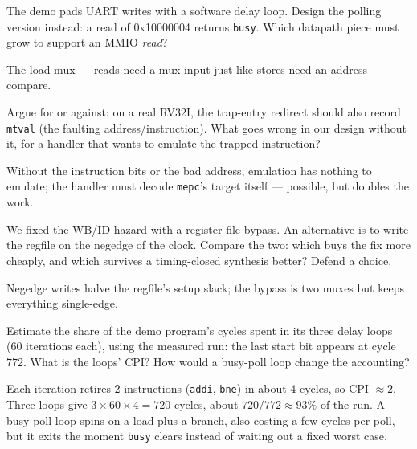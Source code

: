 \begin{exercise}[medium]

The demo pads UART writes with a software delay loop. Design the
polling version instead: a read of 0x10000004 returns
\texttt{busy}. Which datapath piece must grow to support an MMIO
\emph{read}?
\end{exercise}
\begin{solution}[hint]
The load mux --- reads need a mux input just like stores need
an address compare.
\end{solution}

\begin{exercise}[hard]

Argue for or against: on a real RV32I, the trap-entry redirect
should also record \texttt{mtval} (the faulting address/instruction).
What goes wrong in our design without it, for a handler that wants
to emulate the trapped instruction?
\end{exercise}
\begin{solution}[hint]
Without the instruction bits or the bad address, emulation has
nothing to emulate; the handler must decode \texttt{mepc}'s target
itself --- possible, but doubles the work.
\end{solution}

\begin{exercise}[hard]

We fixed the WB/ID hazard with a register-file bypass. An
alternative is to write the regfile on the negedge of the clock.
Compare the two: which buys the fix more cheaply, and which survives
a timing-closed synthesis better? Defend a choice.
\end{exercise}
\begin{solution}[hint]
Negedge writes halve the regfile's setup slack; the bypass is
two muxes but keeps everything single-edge.
\end{solution}

\begin{exercise}[hard]

Estimate the share of the demo program's cycles spent in its three
delay loops (60 iterations each), using the measured run: the last
start bit appears at cycle 772. What is the loops' CPI? How would a
busy-poll loop change the accounting?
\end{exercise}
\begin{solution}[hint]
Each iteration retires 2 instructions (\texttt{addi}, \texttt{bne}) in
about 4 cycles, so CPI $\approx 2$. Three loops give
$3\times60\times4=720$ cycles, about $720/772\approx 93\%$ of the
run. A busy-poll loop spins on a load plus a branch, also costing a few
cycles per poll, but it exits the moment \texttt{busy} clears instead
of waiting out a fixed worst case.
\end{solution}

